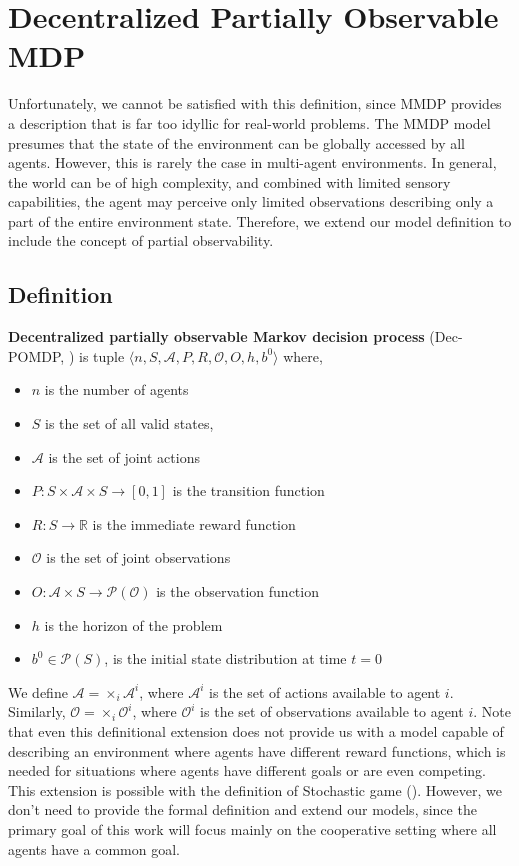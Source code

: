 \section{Decentralized Partially Observable MDP}
Unfortunately, we cannot be satisfied with this definition, since MMDP provides a description that is far too idyllic for real-world problems.
The MMDP model presumes that the state of the environment can be globally accessed by all agents.
However, this is rarely the case in multi-agent environments.
In general, the world can be of high complexity, and combined with limited sensory capabilities, the agent may perceive only limited observations describing only a part of the entire environment state.
Therefore, we extend our model definition to include the concept of partial observability.

\subsection*{Definition}
\textbf{Decentralized partially observable Markov decision process} (Dec-POMDP, \cite{DecPOMDP}) is tuple
$\langle n, S, \mathcal{A}, P, R, \mathcal{O}, O, h, b^0\rangle$ where,
\begin{itemize}
    \item $n$ is the number of agents
    \item $S$ is the set of all valid states,
    \item $\mathcal{A} $ is the set of joint actions
    \item $P: S \times \mathcal{A} \times S \rightarrow [0,1]$ is the transition function
    \item $R: S  \rightarrow \mathbb{R}$ is the immediate reward function
    \item $\mathcal{O}$ is the set of joint observations
    \item $O: \mathcal{A} \times S \rightarrow \mathcal{P}(\mathcal{O})$ is the observation function
    \item $h$ is the horizon of the problem
    \item $b^0 \in \mathcal{P}(S)$, is the initial state distribution at time $t=0$

\end{itemize}

We define $\mathcal{A} = \times_i \mathcal{A}^i$, where $\mathcal{A}^i$ is the set of actions available to agent $i$.
Similarly, $\mathcal{O} = \times_i \mathcal{O}^i$, where $\mathcal{O}^i$ is the set of observations available to agent $i$. 
Note that even this definitional extension does not provide us with a model capable of describing an environment where agents have different reward functions, which is needed for situations where agents have different goals or are even competing.
This extension is possible with the definition of Stochastic game (\cite{StochasticGame}). 
However, we don't need to provide the formal definition and extend our models, since the primary goal of this work will focus mainly on the cooperative setting where all agents have a common goal.

